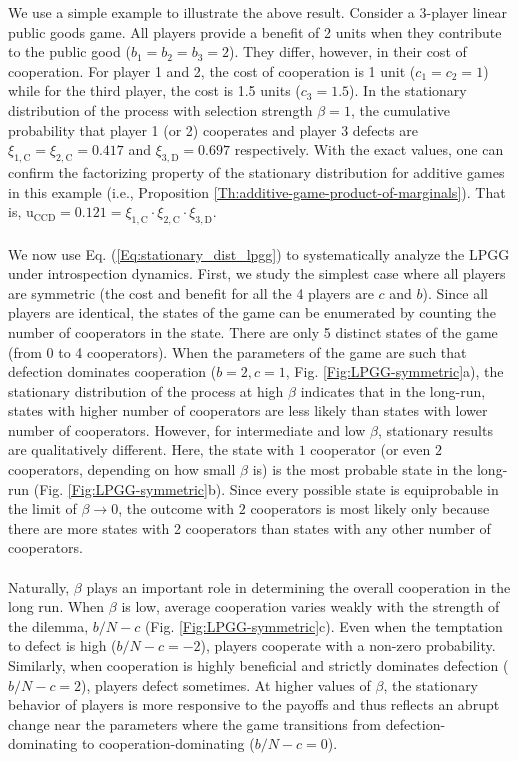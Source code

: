 \documentclass[11pt]{article}
\theoremstyle{plainCl1}
\theoremstyle{plainCl2}
\newcommand{\C}{\mathrm{C}}
\newcommand{\D}{\mathrm{D}}
\begin{document}
\noindent We use a simple example to illustrate the above result. Consider a 3-player linear public goods game. All players provide a benefit of 2 units when they contribute to the public good ($b_1 = b_2 = b_3 = 2$). They differ, however, in their cost of cooperation. For player 1 and 2, the cost of cooperation is 1 unit ($c_1 = c_2 = 1$) while for the third player, the cost is 1.5 units ($c_3 = 1.5$). In the stationary distribution of the process with selection strength $\beta = 1$, the cumulative probability that player 1 (or 2) cooperates and player 3 defects are $\xi_{1,\C} = \xi_{2,\C}= 0.417$ and $\xi_{3,\D} = 0.697$ respectively. With the exact values, one can confirm the factorizing property of the stationary distribution for additive games in this example (i.e., Proposition \ref{Th:additive-game-product-of-marginals}). That is, $\mathrm{u}_{\C\C\D} = 0.121 = \xi_{1,\C} \cdot \xi_{2,\C} \cdot \xi_{3,\D}$. \\ \\
\noindent We now use Eq. (\ref{Eq:stationary_dist_lpgg}) to systematically analyze the LPGG under introspection dynamics. First, we study the simplest case where all players are symmetric (the cost and benefit for all the 4 players are $c$ and $b$). Since all players are identical, the states of the game can be enumerated by counting the number of cooperators in the state. There are only 5 distinct states of the game (from 0 to 4 cooperators).
When the parameters of the game are such that defection dominates cooperation ($b = 2, c = 1$, Fig. \ref{Fig:LPGG-symmetric}a), the stationary distribution of the process at high $\beta$ indicates that in the long-run, states with higher number of cooperators are less likely than states with lower number of cooperators. However, for intermediate and low $\beta$, stationary results are qualitatively different. Here, the state with $1$ cooperator (or even $2$ cooperators, depending on how small $\beta$ is) is the most probable state in the long-run (Fig. \ref{Fig:LPGG-symmetric}b). Since every possible state is equiprobable in the limit of $\beta \to 0$, the outcome with $2$ cooperators is most likely only because there are more states with 2 cooperators than states with any other number of cooperators. \\ \\
\noindent Naturally, $\beta$ plays an important role in determining the overall cooperation in the long run. When $\beta$ is low, average cooperation varies weakly with the strength of the dilemma, $b/N - c$ (Fig. \ref{Fig:LPGG-symmetric}c). Even when the temptation to defect is high ($b/N - c = -2$), players cooperate with a non-zero probability. Similarly, when cooperation is highly beneficial and strictly dominates defection ($b/N - c = 2$), players defect sometimes. At higher values of $\beta$, the stationary behavior of players is more responsive to the payoffs and thus reflects an abrupt change near the parameters where the game transitions from defection-dominating to cooperation-dominating ($b/N - c = 0$).  \\ \\
\end{document}
